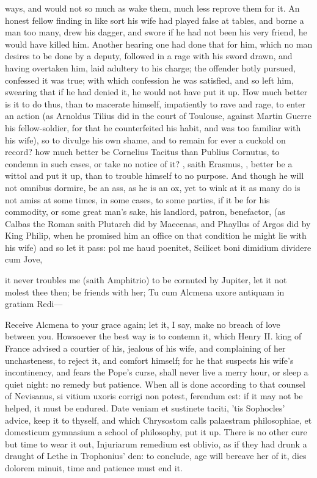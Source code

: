 {ways, and would not so much as wake them, much less reprove them for
it. An honest fellow finding in like sort his wife had played
false at tables, and borne a man too many, drew his dagger, and swore
if he had not been his very friend, he would have killed him. Another
hearing one had done that for him, which no man desires to be done by a
deputy, followed in a rage with his sword drawn, and having overtaken
him, laid adultery to his charge; the offender hotly pursued, confessed
it was true; with which confession he was satisfied, and so left him,
swearing that if he had denied it, he would not have put it up. How
much better is it to do thus, than to macerate himself, impatiently to
rave and rage, to enter an action (as Arnoldus Tilius did in the court
of Toulouse, against Martin Guerre his fellow-soldier, for that he
counterfeited his habit, and was too familiar with his wife), so to
divulge his own shame, and to remain for ever a cuckold on record? how
much better be Cornelius Tacitus than Publius Cornutus, to condemn in
such cases, or take no notice of it? , saith Erasmus, , better be a wittol and put it up,
than to trouble himself to no purpose. And though he will not omnibus
dormire, be an ass, as he is an ox, yet to wink at it as many do is not
amiss at some times, in some cases, to some parties, if it be for his
commodity, or some great man's sake, his landlord, patron, benefactor,
(as Calbas the Roman saith Plutarch did by Maecenas, and Phayllus
of Argos did by King Philip, when he promised him an office on that
condition he might lie with his wife) and so let it pass:
pol me haud poenitet,
Scilicet boni dimidium dividere cum Jove,

it never troubles me (saith Amphitrio) to be cornuted by Jupiter, let
it not molest thee then; be friends with her;
Tu cum Alcmena uxore antiquam in gratiam
Redi---

Receive Alcmena to your grace again; let it, I say, make no breach of
love between you. Howsoever the best way is to contemn it, which
Henry II. king of France advised a courtier of his, jealous of
his wife, and complaining of her unchasteness, to reject it, and
comfort himself; for he that suspects his wife's incontinency, and
fears the Pope's curse, shall never live a merry hour, or sleep a quiet
night: no remedy but patience. When all is done according to that
counsel of Nevisanus, si vitium uxoris corrigi non potest,
ferendum est: if it may not be helped, it must be endured. Date veniam
et sustinete taciti, 'tis Sophocles' advice, keep it to thyself, and
which Chrysostom calls palaestram philosophiae, et domesticum gymnasium
a school of philosophy, put it up. There is no other cure but time to
wear it out, Injuriarum remedium est oblivio, as if they had drunk a
draught of Lethe in Trophonius' den: to conclude, age will bereave her
of it, dies dolorem minuit, time and patience must end it.

}
